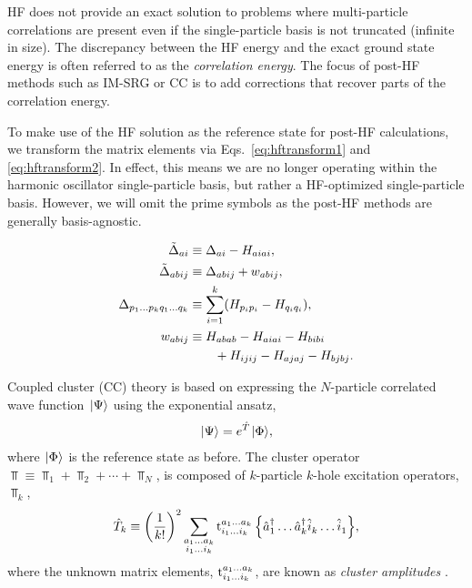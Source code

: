 \documentclass[thesis.tex]{subfiles}
\begin{document}
HF does not provide an exact solution to problems where multi-particle correlations are present even if the single-particle basis is not truncated (infinite in size).  The discrepancy between the HF energy and the exact ground state energy is often referred to as the \textit{correlation energy}.  The focus of post-HF methods such as IM-SRG or CC is to add corrections that recover parts of the correlation energy.

To make use of the HF solution as the reference state for post-HF calculations, we transform the matrix elements via Eqs.\ \eqref{eq:hftransform1} and \eqref{eq:hftransform2}.  In effect, this means we are no longer operating within the harmonic oscillator single-particle basis, but rather a HF-optimized single-particle basis.  However, we will omit the prime symbols as the post-HF methods are generally basis-agnostic.



\begin{align}
\tilde{\Delta}_{a i} &\equiv \Delta_{a i} - H_{a i a i}, \notag \\
\tilde{\Delta}_{a b i j} &\equiv \Delta_{a b i j} + w_{a b i j}, \notag \\
\Delta_{p_1 \ldots p_k q_1 \ldots q_k} &\equiv \sum_{i = 1}^k (H_{p_i p_i} -  H_{q_i q_i}), \label{eq:moellerplessetdenominator} \\
w_{a b i j}
  &\equiv H_{a b a b} - H_{a i a i} - H_{b i b i} \notag \\
  &\qquad + H_{i j i j} - H_{a j a j} - H_{b j b j}. \notag
\end{align}



Coupled cluster (CC) theory is based on expressing the $N$-particle correlated wave function $\hspace{1pt}| \Psi \rangle$ using the exponential ansatz,
\begin{align*}
  \hspace{1pt}| \Psi \rangle = e^{\hat{T}} \hspace{1pt}| \Phi \rangle,
\end{align*}
where $\hspace{1pt}| \Phi \rangle$ is the reference state as before.  The cluster operator $\Top \equiv \Top_{1} + \Top_{2} + \cdots + \Top_{N}$, is composed of $k$-particle $k$-hole excitation operators, $\Top_{k}$,
\begin{align} \label{eq:cc_amps}
  \hat{T}_{k} \equiv \left(\frac{1}{k!}\right)^2 \sum_{\substack{a_1 \ldots a_k \\ i_1 \ldots i_k}} \text{t}^{a_1 \ldots a_k}_{i_1 \ldots i_k}\mathop{\left\{\hat{a}_{1}^\dagger \ldots \hat{a}_{k}^\dagger \hat{i}_{k}^{} \ldots \hat{i}_{1}^{}\right\}},
\end{align}
where the unknown matrix elements, $\text{t}^{a_1 \ldots a_k}_{i_1 \ldots i_k}$, are known as \textit{cluster amplitudes} \cite{SHAVITT2009}.
\end{document}
